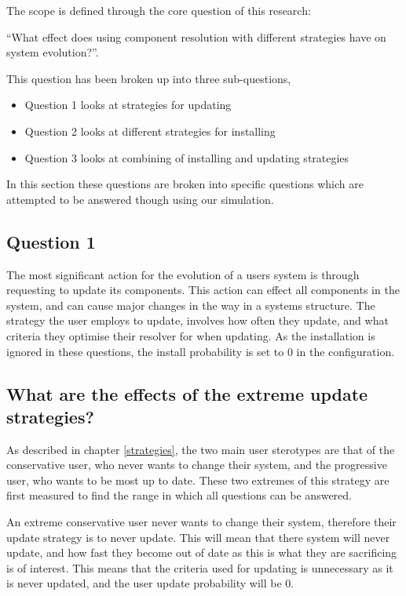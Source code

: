 The scope is defined through the core question of this research:

``What effect does using component resolution with different strategies have on system evolution?''.

This question has been broken up into three sub-questions,
\begin{itemize}
  \item Question 1 looks at strategies for updating
  \item Question 2 looks at different strategies for installing
  \item Question 3 looks at combining of installing and updating strategies
\end{itemize}

In this section these questions are broken into specific questions which are attempted to be answered though using our simulation.

\subsection{Question 1}
The most significant action for the evolution of a users system is through requesting to update its components.
This action can effect all components in the system, and can cause major changes in the way in a systems structure.
The strategy the user employs to update, involves how often they update, and what criteria they optimise their resolver for when updating.
As the installation is ignored in these questions, the install probability is set to 0 in the configuration.


\subsection{What are the effects of the extreme update strategies?}
As described in chapter \ref{strategies}, the two main user sterotypes are that of the conservative user, who never wants to change their system,
and the progressive user, who wants to be most up to date.
These two extremes of this strategy are first measured to find the range in which all questions can be answered.

An extreme conservative user never wants to change their system, therefore their update strategy is to never update.
This will mean that there system will never update, and how fast they become out of date as this is what they are sacrificing is of interest.
This means that the criteria used for updating is unnecessary as it is never updated, and the user update probability will be 0.

